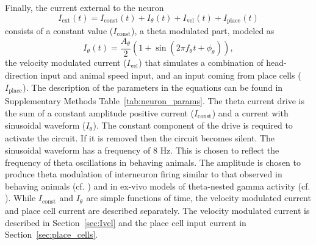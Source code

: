 \documentclass[a4paper,12pt]{article}
\newcommand{\ssc}[3]{\ensuremath{#1_{\text{#2}_{\text{#3}}}}}
\newcommand{\Iext}     {\ssc{I}      {ext}   {}}
\newcommand{\Iconst}   {\ssc{I}      {const} {}}
\newcommand{\Itheta}   {\ssc{I}      {$\theta$}{}}
\newcommand{\Atheta}   {\ssc{A}      {$\theta$}{}}
\newcommand{\ftheta}   {\ssc{f}      {$\theta$}{}}
\newcommand{\phitheta} {\ssc{\phi}   {$\theta$}{}}
\newcommand{\Ivel}     {\ssc{I}      {vel}   {}}
\newcommand{\Iplace}   {\ssc{I}      {place} {}}
\begin{document}
Finally, the current external to the neuron
\begin{equation}
    \Iext(t) = \Iconst(t) + \Itheta(t) + \Ivel(t) + \Iplace(t)
    \label{eq:Iext}
\end{equation}
consists of a constant value ($\Iconst$), a theta modulated part, modeled as
\begin{equation}
    \Itheta(t) = \frac{\Atheta}{2} (1 + \sin(2\pi\ftheta t + \phitheta)),
    \label{eq:Itheta}
\end{equation}
the velocity modulated current ($\Ivel$) that simulates a combination of
head-direction input and animal speed input, and an input coming from place
cells ($\Iplace$).  The description of the parameters in the equations can be
found in Supplementary Methods Table~\ref{tab:neuron_params}. The theta current
drive is the sum of a constant amplitude positive current ($\Iconst$) and a
current with sinusoidal waveform ($\Itheta$). The constant component of the
drive is required to activate the circuit. If it is removed then the circuit
becomes silent. The sinusoidal waveform has a frequency of 8 Hz. This is chosen
to reflect the frequency of theta oscillations in behaving animals. The
amplitude is chosen to produce theta modulation of interneuron firing similar
to that observed in behaving animals (cf. \citep{Chrobak:1998vr}) and in
ex-vivo models of theta-nested gamma activity (cf. \citep{Pastoll:2013ff}).
While $\Iconst$ and $\Itheta$ are simple functions of time, the velocity
modulated current and place cell current are described separately. The velocity
modulated current is described in Section~\ref{sec:Ivel} and the place cell
input current in Section~\ref{sec:place_cells}.
\end{document}
